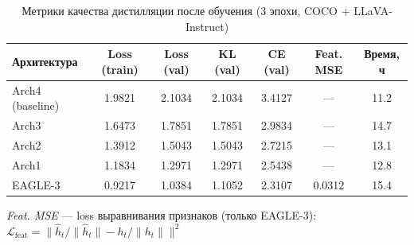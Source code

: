 \documentclass[12pt, a4paper]{article}
\begin{document}
\begin{table}[h]
\centering
\caption{Метрики качества дистилляции после обучения (3 эпохи, COCO + LLaVA-Instruct)}
\label{tab:training_results}
\renewcommand{\arraystretch}{1.35}
\begin{tabular}{
  l
  S[table-format=1.4]
  S[table-format=1.4]
  S[table-format=1.4]
  S[table-format=1.4]
  S[table-format=1.4]
  S[table-format=2.1]
}
\toprule
\textbf{Архитектура} &
{\textbf{Loss (train)}} &
{\textbf{Loss (val)}} &
{\textbf{KL (val)}} &
{\textbf{CE (val)}} &
{\textbf{Feat. MSE}} &
{\textbf{Время, ч}} \\
\midrule
Arch4 (baseline)       & 1.9821 & 2.1034 & 2.1034 & 3.4127 & {—}    & 11.2 \\
Arch3                  & 1.6473 & 1.7851 & 1.7851 & 2.9834 & {—}    & 14.7 \\
Arch2                  & 1.3912 & 1.5043 & 1.5043 & 2.7215 & {—}    & 13.1 \\
Arch1                  & 1.1834 & 1.2971 & 1.2971 & 2.5438 & {—}    & 12.8 \\
EAGLE-3                & 0.9217 & 1.0384 & 1.1052 & 2.3107 & 0.0312 & 15.4 \\
\bottomrule
\end{tabular}
\smallskip

\footnotesize
\textit{Feat. MSE} — loss выравнивания признаков (только EAGLE-3):
$\mathcal{L}_\text{feat} = \|\hat{h}_t / \|\hat{h}_t\| - h_t / \|h_t\|\|^2$
\end{table}
\end{document}
